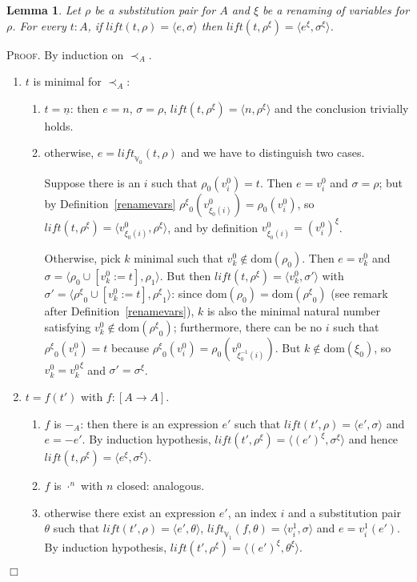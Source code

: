 \documentclass{article}
\newtheorem{lemma}[definition]{Lemma}
\newenvironment{proof}{\smallskip\textsc{Proof.}}{\hspace*{\fill}$\Box$}
\newcommand{\V}{{\mathbb V}}
\newcommand{\less}{\mathrel{\prec_A}}
\newcommand{\liftv}[1]{\ensuremath{\mathit{lift}_{\V_{#1}}}}
\newcommand{\lift}{\ensuremath{\mathit{lift}}}
\newcommand{\dom}{\ensuremath{\mathrm{dom}}}
\newcommand{\renamevar}[2]{\ensuremath{{#1}^{#2}}}
\newcommand{\isrenamevar}[3]{\ensuremath{{#1}=\renamevar{#2}{#3}}}
\begin{document}
\begin{lemma}\label{renamelift}
Let $\rho$ be a substitution pair for $A$ and $\xi$ be a renaming of
variables for $\rho$.  For every $t:A$, if $\lift(t,\rho)=\langle
e,\sigma\rangle$ then $\lift(t,\renamevar\rho\xi)=%
\langle\renamevar{e}\xi,\renamevar\sigma\xi\rangle$.
\end{lemma}
\begin{proof} By induction on $\less$.
\begin{enumerate}
\item $t$ is minimal for $\less$:
\begin{enumerate}
\item $t=\underline n$: then $e=n$, $\sigma=\rho$,
$\lift(t,{\renamevar\rho\xi})=\langle n,{\renamevar\rho\xi}\rangle$ and the 
conclusion trivially holds.
\item otherwise, $e=\liftv0(t,\rho)$ and we have to distinguish two
cases.

Suppose there is an $i$ such that $\rho_0(v^0_i)=t$.  Then $e=v^0_i$ and
$\sigma=\rho$; but by Definition~\ref{renamevars}
$\renamevar\rho\xi_0\left(v^0_{\xi_0(i)}\right)=\rho_0(v^0_i)$, so
$\lift(t,\renamevar\rho\xi)=\langle v^0_{\xi_0(i)},\renamevar\rho\xi\rangle$,
and by definition {\isrenamevar{v^0_{\xi_0(i)}}{(v^0_i)}\xi}.

Otherwise, pick $k$ minimal such that $v^0_k\not\in\dom(\rho_0)$.
Then $e=v^0_k$ and $\sigma=\langle\rho_0\cup[v^0_k:=t],\rho_1\rangle$.
But then $\lift(t,{\renamevar\rho\xi})=\langle v^0_k,\sigma'\rangle$ with
$\sigma'=\langle\renamevar\rho\xi_0\cup[v^0_k:=t],\renamevar\rho\xi_1\rangle$: since
$\dom(\rho_0)=\dom(\renamevar\rho\xi_0)$ (see remark after
Definition~\ref{renamevars}), $k$ is also the minimal natural number
satisfying $v^0_k\not\in\dom(\renamevar\rho\xi_0)$; furthermore, there can be no
$i$ such that $\renamevar\rho\xi_0(v^0_i)=t$ because
$\renamevar\rho\xi_0(v^0_i)=\rho_0(v^0_{\xi^{-1}_0(i)})$.  But $k\not\in\dom(\xi_0)$,
so {\isrenamevar{v^0_k}{v^0_k}\xi} and {\isrenamevar{\sigma'}\sigma\xi}.
\end{enumerate}
\item $t=f(t')$ with $f:[A\to A]$.
\begin{enumerate}
\item $f$ is $-_A$: then there is an expression $e'$ such that
$\lift(t',\rho)=\langle e',\sigma\rangle$ and $e=-e'$.
By induction hypothesis,
$\lift(t',{\renamevar\rho\xi})=\langle\renamevar{(e')}\xi,\renamevar\sigma\xi\rangle$
and hence $\lift(t,{\renamevar\rho\xi})=\langle\renamevar e\xi,\renamevar\sigma\xi\rangle$.
\item $f$ is $\cdot^n$ with $n$ closed: analogous.
\item otherwise there exist an expression $e'$, an index $i$ and
a substitution pair $\theta$ such that
$\lift(t',\rho)=\langle e',\theta\rangle$,
$\liftv1(f,\theta)=\langle v^1_i,\sigma\rangle$ and $e=v^1_i(e')$.
By induction hypothesis, $\lift(t',{\renamevar\rho\xi})=%
\langle\renamevar{(e')}\xi,\renamevar\theta\xi\rangle$.


\end{enumerate}
\end{enumerate}
\end{proof}
\end{document}
